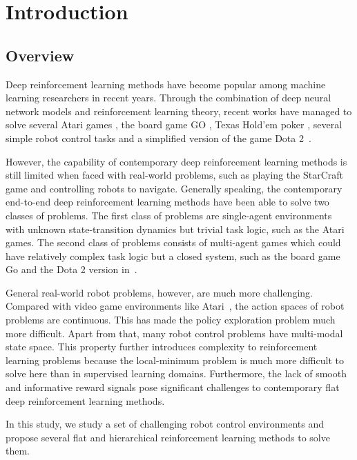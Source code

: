 
\chapter{Introduction}
\section{Overview}
Deep reinforcement learning methods have become popular among machine learning researchers in recent years. Through the combination of deep neural network models and reinforcement learning theory, recent works have managed to solve several Atari games \cite{mnih2015human}, the board game GO \cite{silver2016mastering}, Texas Hold'em poker \cite{heinrich2016deep}, several simple robot control tasks \cite{duan2016benchmarking} and a simplified version of the game Dota 2~\cite{openai_2018}.

However, the capability of contemporary deep reinforcement learning methods is still limited when faced with real-world problems, such as playing the StarCraft game and controlling robots to navigate. Generally speaking, the contemporary end-to-end deep reinforcement learning methods have been able to solve two classes of problems. The first class of problems are single-agent environments with unknown state-transition dynamics but trivial task logic, such as the Atari games. The second class of problems consists of multi-agent games which could have relatively complex task logic but a closed system, such as the board game Go and the Dota 2 version in~\cite{openai_2018}. 

General real-world robot problems, however, are much more challenging. Compared with video game environments like Atari~\cite{mnih2015human}, the action spaces of robot problems are continuous. This has made the policy exploration problem much more difficult. Apart from that, many robot control problems have multi-modal state space. This property further introduces complexity to reinforcement learning problems because the local-minimum problem is much more difficult to solve here than in supervised learning domains. Furthermore, the lack of smooth and informative reward signals pose significant challenges to contemporary flat deep reinforcement learning methods.

In this study, we study a set of challenging robot control environments and propose several flat and hierarchical reinforcement learning methods to solve them.
